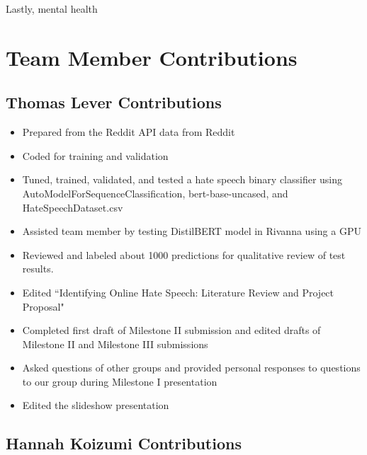 \documentclass[conference]{IEEEtran}
\begin{document}
Lastly, mental health 

\section{Team Member Contributions}

\subsection{Thomas Lever Contributions}

\begin{itemize}
  \item Prepared from the Reddit API data from Reddit
  \item Coded for training and validation
  \item Tuned, trained, validated, and tested a hate speech binary classifier using AutoModelForSequenceClassification, bert-base-uncased, and HateSpeechDataset.csv
  \item Assisted team member by testing DistilBERT model in Rivanna using a GPU
  \item Reviewed and labeled about 1000 predictions for qualitative review of test results.
 \item Edited “Identifying Online Hate Speech: Literature Review and Project Proposal"
 \item Completed first draft of Milestone II submission and edited drafts of Milestone II and Milestone III submissions
 \item Asked questions of other groups and provided personal responses to questions to our group during Milestone I presentation
 \item Edited the slideshow presentation
\end{itemize}

\subsection{Hannah Koizumi Contributions}
\end{document}
